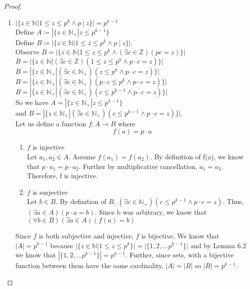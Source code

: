 \documentclass{article}
\newcommand{\defeq}{\coloneqq}
\newcommand{\naturals}{\mathbb{N}}
\newcommand{\divides}{\:\mathbb{|}\: }
\newcommand{\integers}{\mathbb{Z}}
\begin{document}
\begin{enumerate}
\begin{enumerate}
\begin{proof}
\begin{enumerate}
                \item $|\{z \in \naturals| 1 \leq z \leq p^k \land p \divides z\}|=p^{k-1}$\\
                Define $A \defeq |\{z\in \naturals_+|z\leq p^{k-1}\}$\\
                Define $B \defeq |\{z \in \naturals| 1 \leq z \leq p^k \land p \divides z\}|$.\\
                Observe $B = |\{z \in \naturals|1 \leq z \leq p^k \land (\exists c \in \integers)(pc = z)\}|$\\
                $B = |\{z \in \naturals|(\exists c \in \integers)(1 \leq z \leq p^k \land p \cdot c = z)\}|$\\
                $B = |\{z \in \naturals_+|(\exists c \in \naturals_+)(z \leq p^k \land p \cdot c = z)\}|$\\
                $B = |\{z \in \naturals_+|(\exists c \in \naturals_+)(p \cdot c \leq p^k \land p \cdot c = z)\}|$\\
                $B = |\{z \in \naturals_+|(\exists c \in \naturals_+)(c \leq p^{k-1} \land p \cdot c = z)\}|$\\
                So we have $A = |\{z\in \naturals_+|z\leq p^{k-1}\}$\\
                and $B = |\{z \in \naturals_+|(\exists c \in \naturals_+)(c \leq p^{k-1} \land p \cdot c = z)\}|$.\\
                Let us define a function $f:A \to B$ where
                \begin{equation*}
                    f(a)=p \cdot a
                \end{equation*}
                    \begin{enumerate}
                        \item $f$ is injective\\
                        Let $a_1,a_2 \in A$. Assume $f(a_1)=f(a_2)$. By definition of f(a), we know that $p \cdot a_1=p \cdot a_2$. Further by multiplicative cancellation, $a_1=a_2$. Therefore, f is injective.
                        \item $f$ is surjective\\
                        Let $b \in B$. By definition of $B$, $(\exists c \in \naturals_+)(c \leq p^{k-1} \land p \cdot c = z)$. Thus, $(\exists a \in A)(p \cdot a=b)$. Since b was arbitrary, we know that $(\forall b \in B)(\exists a \in A)(f(a)=b)$
                    \end{enumerate}
                Since $f$ is both subjective and injective, $f$ is bijective.  We know that $|A|=p^{k-1}$ because $|\{z \in \naturals| 1 \leq z \leq p^k\}|=|\{1,2,...p^{k-1}\}|$ and by Lemma 6.2 we know that $|\{1,2,...p^{k-1}\}|=p^{k-1}$. Further, since sets, with a bijective function between them have the same cardinality, $|A|=|B|$ so $|B|=p^{k-1}$.

\end{enumerate}
\end{proof}
\end{enumerate}
\end{enumerate}
\end{document}
